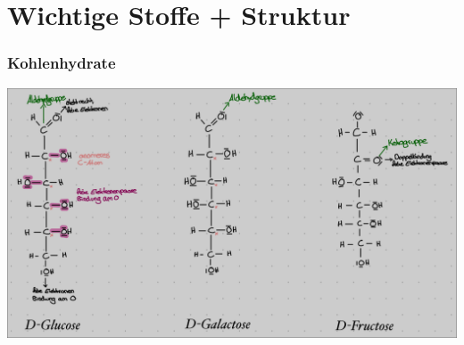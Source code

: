\section{Wichtige Stoffe + Struktur}
\subsubsection{Kohlenhydrate}
\includegraphics[scale=0.30]{media/naturstoffe/stoffe.png} \\\\
